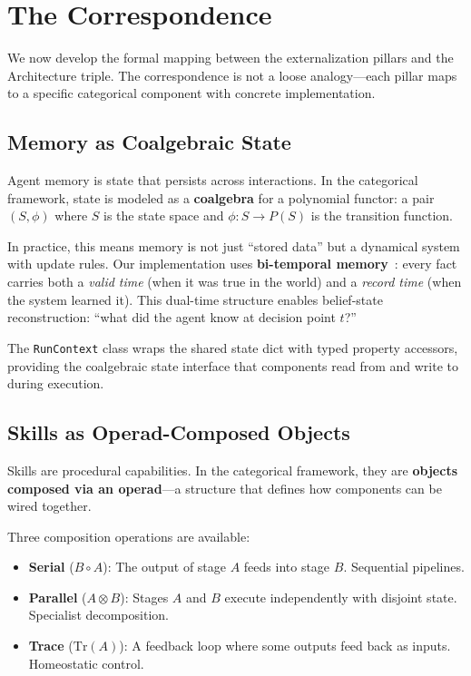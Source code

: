 \section{The Correspondence}\label{sec:correspondence}

We now develop the formal mapping between the externalization pillars and the Architecture triple. The correspondence is not a loose analogy---each pillar maps to a specific categorical component with concrete implementation.

\subsection{Memory as Coalgebraic State}

Agent memory is state that persists across interactions. In the categorical framework, state is modeled as a \textbf{coalgebra} for a polynomial functor: a pair $(S, \phi)$ where $S$ is the state space and $\phi: S \to P(S)$ is the transition function.

In practice, this means memory is not just ``stored data'' but a dynamical system with update rules. Our implementation uses \textbf{bi-temporal memory}~\cite{snodgrass2000temporal}: every fact carries both a \emph{valid time} (when it was true in the world) and a \emph{record time} (when the system learned it). This dual-time structure enables belief-state reconstruction: ``what did the agent know at decision point $t$?''

The \texttt{RunContext} class wraps the shared state dict with typed property accessors, providing the coalgebraic state interface that components read from and write to during execution.

\subsection{Skills as Operad-Composed Objects}

Skills are procedural capabilities. In the categorical framework, they are \textbf{objects composed via an operad}---a structure that defines how components can be wired together.

Three composition operations are available:

\begin{itemize}[leftmargin=*]
\item \textbf{Serial} ($B \circ A$): The output of stage $A$ feeds into stage $B$. Sequential pipelines.
\item \textbf{Parallel} ($A \otimes B$): Stages $A$ and $B$ execute independently with disjoint state. Specialist decomposition.
\item \textbf{Trace} ($\mathrm{Tr}(A)$): A feedback loop where some outputs feed back as inputs. Homeostatic control.
\end{itemize}

